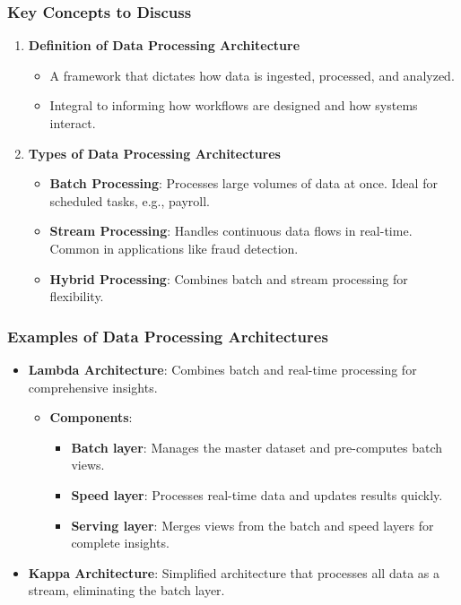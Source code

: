 \documentclass[aspectratio=169]{beamer}
\begin{document}
\begin{frame}[fragile]
  \frametitle{Key Concepts to Discuss}
  \begin{enumerate}
    \item \textbf{Definition of Data Processing Architecture}
      \begin{itemize}
        \item A framework that dictates how data is ingested, processed, and analyzed.
        \item Integral to informing how workflows are designed and how systems interact.
      \end{itemize}

    \item \textbf{Types of Data Processing Architectures}
      \begin{itemize}
        \item \textbf{Batch Processing}: Processes large volumes of data at once. Ideal for scheduled tasks, e.g., payroll.
        \item \textbf{Stream Processing}: Handles continuous data flows in real-time. Common in applications like fraud detection.
        \item \textbf{Hybrid Processing}: Combines batch and stream processing for flexibility.
      \end{itemize}
  \end{enumerate}
\end{frame}

\begin{frame}[fragile]
  \frametitle{Examples of Data Processing Architectures}
  \begin{itemize}
    \item \textbf{Lambda Architecture}: Combines batch and real-time processing for comprehensive insights.
      \begin{itemize}
        \item \textbf{Components}:
          \begin{itemize}
            \item \textbf{Batch layer}: Manages the master dataset and pre-computes batch views.
            \item \textbf{Speed layer}: Processes real-time data and updates results quickly.
            \item \textbf{Serving layer}: Merges views from the batch and speed layers for complete insights.
          \end{itemize}
      \end{itemize}

    \item \textbf{Kappa Architecture}: Simplified architecture that processes all data as a stream, eliminating the batch layer.
  \end{itemize}
\end{frame}
\end{document}
